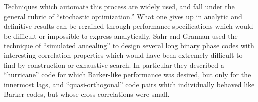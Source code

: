 Techniques which automate this process are widely used, and fall under
the general rubric of ``stochastic optimization.''  What one gives up
in analytic and definitive results can be regained through performance
specifications which would be difficult or impossible to express
analytically.  Sahr and Grannan\cite{sahr+grannan-1993} used the
technique of ``simulated annealing'' to design several long binary
phase codes with interesting correlation properties which would have
been extremely difficult to find by construction or exhaustive
search.  In particular they described a ``hurricane'' code for which
Barker-like performance was desired, but only for the innermost lags,
and ``quasi-orthogonal'' code pairs which individually behaved like
Barker codes, but whose cross-correlations were small.


